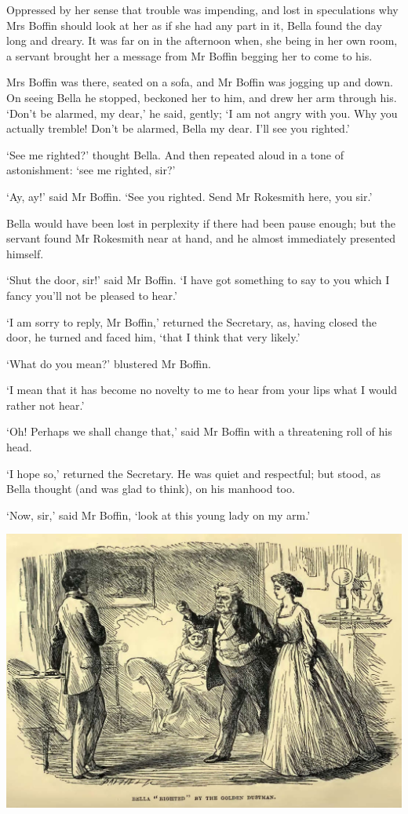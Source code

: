 Oppressed by her sense that trouble was impending, and lost in
speculations why Mrs Boffin should look at her as if she had any part in
it, Bella found the day long and dreary. It was far on in the afternoon
when, she being in her own room, a servant brought her a message from Mr
Boffin begging her to come to his.

Mrs Boffin was there, seated on a sofa, and Mr Boffin was jogging up and
down. On seeing Bella he stopped, beckoned her to him, and drew her arm
through his. ‘Don’t be alarmed, my dear,’ he said, gently; ‘I am not
angry with you. Why you actually tremble! Don’t be alarmed, Bella my
dear. I’ll see you righted.’

‘See me righted?’ thought Bella. And then repeated aloud in a tone of
astonishment: ‘see me righted, sir?’

‘Ay, ay!’ said Mr Boffin. ‘See you righted. Send Mr Rokesmith here, you
sir.’

Bella would have been lost in perplexity if there had been pause
enough; but the servant found Mr Rokesmith near at hand, and he almost
immediately presented himself.

‘Shut the door, sir!’ said Mr Boffin. ‘I have got something to say to
you which I fancy you’ll not be pleased to hear.’

‘I am sorry to reply, Mr Boffin,’ returned the Secretary, as, having
closed the door, he turned and faced him, ‘that I think that very
likely.’

‘What do you mean?’ blustered Mr Boffin.

‘I mean that it has become no novelty to me to hear from your lips what
I would rather not hear.’

‘Oh! Perhaps we shall change that,’ said Mr Boffin with a threatening
roll of his head.

‘I hope so,’ returned the Secretary. He was quiet and respectful; but
stood, as Bella thought (and was glad to think), on his manhood too.

‘Now, sir,’ said Mr Boffin, ‘look at this young lady on my arm.’

\includegraphics[scale=2.3]{03-15-01}

